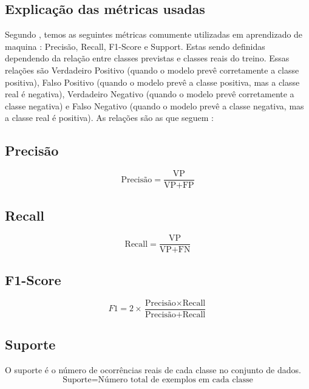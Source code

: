 \documentclass[12pt]{article}
\begin{document}
\subsection{Explicação das métricas usadas}
Segundo \cite{powers2011evaluation}, temos as seguintes métricas comumente utilizadas em aprendizado de maquina : Precisão, Recall, F1-Score e Support. Estas sendo definidas dependendo da relação entre classes previstas e classes reais do treino. Essas relações são Verdadeiro Positivo (quando o modelo prevê corretamente a classe positiva), Falso Positivo (quando o modelo prevê a classe positiva, mas a classe real é negativa), Verdadeiro Negativo (quando o modelo prevê corretamente a classe negativa) e Falso Negativo (quando o modelo prevê a classe negativa, mas a classe real é positiva). As relações são as que seguem :
\subsection*{Precisão}
\[
\text{Precisão} = \frac{\text{VP}}{\text{VP} + \text{FP}}
\]

\subsection*{Recall}
\[
\text{Recall} = \frac{\text{VP}}{\text{VP} + \text{FN}}
\]

\subsection*{F1-Score}
\[
F1 = 2 \times \frac{\text{Precisão} \times \text{Recall}}{\text{Precisão} + \text{Recall}}
\]

\subsection*{Suporte}
O suporte é o número de ocorrências reais de cada classe no conjunto de dados.
\[
\text{Suporte} = \text{Número total de exemplos em cada classe}
\]
\end{document}
